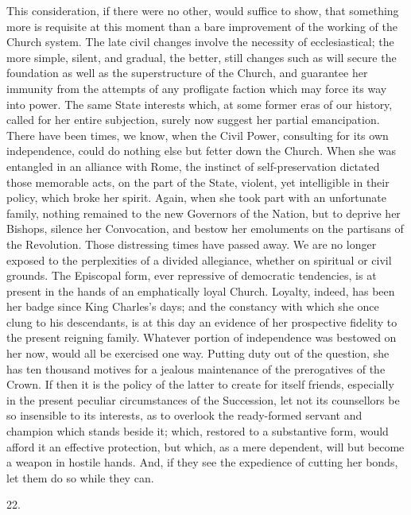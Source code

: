 This consideration, if there were no other, would
suffice to show, that something more is requisite at this moment than
a bare improvement of the working of the Church system. The late civil
changes involve the necessity of ecclesiastical; the more simple,
silent, and gradual, the better, still changes such as will secure the
foundation as well as the superstructure of the Church, and guarantee
her immunity from the attempts of any profligate faction which may
force its way into power. The same State interests which, at some
former eras of our history, called for her entire subjection, surely
now suggest her partial emancipation. There have been times, we know,
when the Civil Power, consulting for its own independence, could do
nothing else but fetter down the Church. When she was entangled in an
alliance with Rome, the instinct of self-preservation dictated those
memorable acts, on the part of the State, violent, yet intelligible in
their policy, which broke her spirit. Again, when she took part with
an unfortunate family, nothing remained to the new Governors of the
Nation, but to deprive her Bishops, silence her Convocation, and
bestow her emoluments on the partisans of the Revolution. Those
distressing times have passed away. We are no longer exposed to the
perplexities of a divided allegiance, whether on spiritual or
civil grounds. The Episcopal form, ever repressive of democratic
tendencies, is at present in the hands of an emphatically loyal
Church. Loyalty, indeed, has been her badge since King Charles's days;
and the constancy with which she once clung to his descendants, is at
this day an evidence of her prospective fidelity to the present
reigning family. Whatever portion of independence was bestowed on her
now, would all be exercised one way. Putting duty out of the question,
she has ten thousand motives for a jealous maintenance of the
prerogatives of the Crown. If then it is the policy of the latter to
create for itself friends, especially in the present peculiar
circumstances of the Succession, let not its counsellors be so
insensible to its interests, as to overlook the ready-formed servant
and champion which stands beside it; which, restored to a substantive
form, would afford it an effective protection, but which, as a mere
dependent, will but become a weapon in hostile hands. And, if they see
the expedience of cutting her bonds, let them do so while they can.

22.

